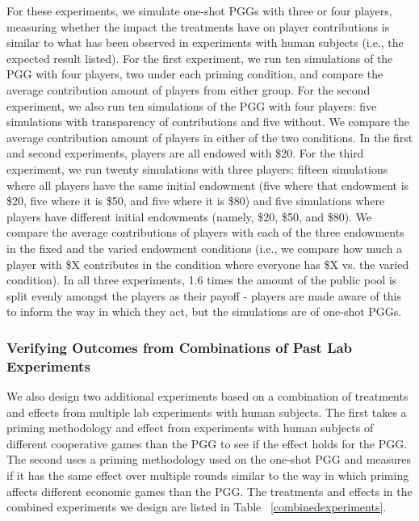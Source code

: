 For these experiments, we simulate one-shot PGGs with three or four players, measuring whether the impact the treatments have on player contributions is similar to what has been observed in experiments with human subjects (i.e., the expected result listed). For the first experiment, we run ten simulations of the PGG with four players, two under each priming condition, and compare the average contribution amount of players from either group. For the second experiment, we also run ten simulations of the PGG with four players: five simulations with transparency of contributions and five without. We compare the average contribution amount of players in either of the two conditions. In the first and second experiments, players are all endowed with \$20. For the third experiment, we run twenty simulations with three players: fifteen simulations where all players have the same initial endowment (five where that endowment is \$20, five where it is \$50, and five where it is \$80) and five simulations where players have different initial endowments (namely, \$20, \$50, and \$80). We compare the average contributions of players with each of the three endowments in the fixed and the varied endowment conditions (i.e., we compare how much a player with \$X contributes in the condition where everyone has \$X vs. the varied condition). In all three experiments, 1.6 times the amount of the public pool is split evenly amongst the players as their payoff - players are made aware of this to inform the way in which they act, but the simulations are of one-shot PGGs.

\subsubsection{Verifying Outcomes from Combinations of Past Lab Experiments}

We also design two additional experiments based on a combination of treatments and effects from multiple lab experiments with human subjects. The first takes a priming methodology and effect from experiments with human subjects of different cooperative games than the PGG to see if the effect holds for the PGG. The second uses a priming methodology used on the one-shot PGG and measures if it has the same effect over multiple rounds similar to the way in which priming affects different economic games than the PGG. The treatments and effects in the combined experiments we design are listed in Table ~\ref{combinedexperiments}.

